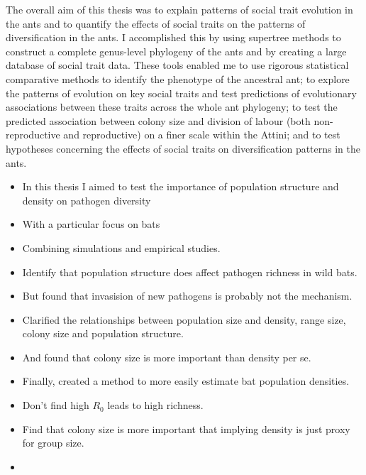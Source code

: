 
The overall aim of this thesis was to explain patterns of social trait evolution in the ants and to
quantify the effects of social traits on the patterns of diversification in the ants. I accomplished
this by using supertree methods to construct a complete genus-level phylogeny of the ants and
by creating a large database of social trait data. These tools enabled me to use rigorous
statistical comparative methods to identify the phenotype of the ancestral ant; to explore the
patterns of evolution on key social traits and test predictions of evolutionary associations
between these traits across the whole ant phylogeny; to test the predicted association between
colony size and division of labour (both non-reproductive and reproductive) on a finer scale
within the Attini; and to test hypotheses concerning the effects of social traits on diversification
patterns in the ants.

\begin{itemize}
\item In this thesis I aimed to test the importance of population structure and density on pathogen diversity
\item With a particular focus on bats
\item Combining simulations and empirical studies.
\item Identify that population structure does affect pathogen richness in wild bats.
\item But found that invasision of new pathogens is probably not the mechanism.  
\item Clarified the relationships between population size and density, range size, colony size and population structure.
\item And found that colony size is more important than density per se. 
\item Finally, created a method to more easily estimate bat population densities.
\end{itemize}













\begin{itemize}
\item Don't find high $R_0$ leads to high richness.
\item Find that colony size is more important that implying density is just proxy for group size.
\item 


\end{itemize}


